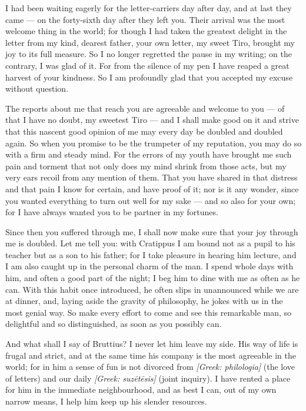 

 I had been waiting eagerly for the letter-carriers day after day, and at last they came --- on the forty-sixth day after they left you. Their arrival was the most welcome thing in the world; for though I had taken the greatest delight in the letter from my kind, dearest father, your own letter, my sweet Tiro, brought my joy to its full measure. So I no longer regretted the pause in my writing; on the contrary, I was glad of it. For from the silence of my pen I have reaped a great harvest of your kindness. So I am profoundly glad that you accepted my excuse without question.

 The reports about me that reach you are agreeable and welcome to you --- of that I have no doubt, my sweetest Tiro --- and I shall make good on it and strive that this nascent good opinion of me may every day be doubled and doubled again. So when you promise to be the trumpeter of my reputation, you may do so with a firm and steady mind. For the errors of my youth have brought me such pain and torment that not only does my mind shrink from those acts, but my very ears recoil from any mention of them. That you have shared in that distress and that pain I know for certain, and have proof of it; nor is it any wonder, since you wanted everything to turn out well for my sake --- and so also for your own; for I have always wanted you to be partner in my fortunes.

 Since then you suffered through me, I shall now make sure that your joy through me is doubled. Let me tell you: with Cratippus I am bound not as a pupil to his teacher but as a son to his father; for I take pleasure in hearing him lecture, and I am also caught up in the personal charm of the man. I spend whole days with him, and often a good part of the night; I beg him to dine with me as often as he can. With this habit once introduced, he often slips in unannounced while we are at dinner, and, laying aside the gravity of philosophy, he jokes with us in the most genial way. So make every effort to come and see this remarkable man, so delightful and so distinguished, as soon as you possibly can.

 And what shall I say of Bruttius? I never let him leave my side. His way of life is frugal and strict, and at the same time his company is the most agreeable in the world; for in him a sense of fun is not divorced from \textit{[Greek: philologia]} (the love of letters) and our daily \textit{[Greek: suz\=et\=esis]} (joint inquiry). I have rented a place for him in the immediate neighbourhood, and as best I can, out of my own narrow means, I help him keep up his slender resources.

